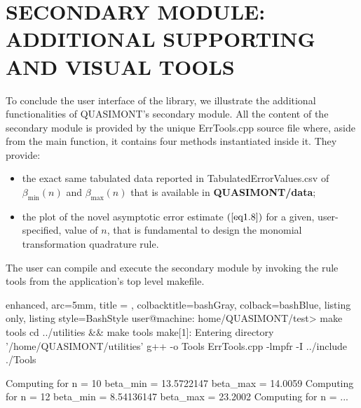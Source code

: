 \documentclass[a4paper, twosided]{book}
\begin{document}
\section[Additional supporting and visual tools]{\changefont SECONDARY MODULE:  ADDITIONAL SUPPORTING AND VISUAL TOOLS}\label{Sec3.4}

\noindent
To conclude the user interface of the library, we illustrate the additional functionalities of QUASIMONT's secondary module. All the content of the secondary module is provided by the unique \colorbox{poliGrayBlue}{ErrTools.cpp} source file where, aside from the \colorbox{poliGrayBlue}{main} function, it contains four methods instantiated inside it. They provide:
\begin{itemize}
    \item the exact same tabulated data reported in \colorbox{poliGrayBlue}{TabulatedErrorValues.csv} of $\beta_{\text{min}}(n)$ and $\beta_{\text{max}}(n)$ that is available in \colorbox{poliGrayBlue}{\textbf{QUASIMONT/data}};
    \item the plot of the novel asymptotic error estimate $(\ref{eq1.8})$ for a given, user-specified, value of $n$, that is fundamental to design the monomial transformation quadrature rule. \color{black} 
\end{itemize}

\noindent
The user can compile and execute the secondary module by invoking the rule \colorbox{poliGrayBlue}{tools} from the application's top level \colorbox{poliGrayBlue}{makefile}.

\vspace{0.25cm}
\begin{tcblisting}{enhanced,
                   arc=5mm,
                   title = \color{black}{\large \ttfamily Compilation and execution of QUASIMONT's secondary module},
                   colbacktitle=bashGray,
                   colback=bashBlue,
                   listing only,
                   listing style=BashStyle}
user@machine: home/QUASIMONT/test> make tools
cd ../utilities && make tools
make[1]: Entering directory '/home/QUASIMONT/utilities'
g++ -o Tools ErrTools.cpp -lmpfr -I ../include
./Tools

Computing for n = 10
    beta_min = 13.5722147
    beta_max = 14.0059
Computing for n = 12
    beta_min = 8.54136147
    beta_max = 23.2002
Computing for n = ...
\end{tcblisting}
\end{document}
